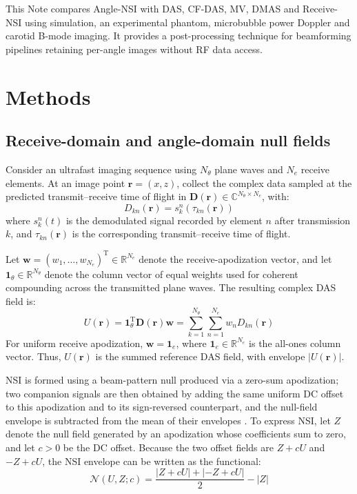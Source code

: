 \documentclass{iopjournal}
\newcommand{\ones}{\bm{1}}
\newcommand{\Dmat}{\bm{D}}
\newcommand{\rvec}{\bm{r}}
\providecommand{\revstart}{}
\providecommand{\revstop}{}
\begin{document}
\revstart This Note compares Angle-NSI with DAS, CF-DAS, MV, DMAS and Receive-NSI using simulation, an experimental phantom, microbubble power Doppler and carotid B-mode imaging. It provides a post-processing technique for beamforming pipelines retaining per-angle images without RF data access. \revstop

\section{Methods}

\subsection{Receive-domain and angle-domain null fields}

Consider an ultrafast imaging sequence using $N_\theta$ plane waves and $N_e$
receive elements. At an image point $\rvec=(x,z)$, collect the complex data
sampled at the predicted transmit--receive time of flight in
$\Dmat(\rvec)\in\mathbb{C}^{N_\theta\times N_e}$, with:
\begin{equation}
D_{kn}(\rvec)=s_k^n\!\left(\tau_{kn}(\rvec)\right)
\end{equation}
where $s_k^n(t)$ is the demodulated signal recorded by element $n$ after
transmission $k$, and $\tau_{kn}(\rvec)$ is the corresponding
transmit--receive time of flight.

Let $\bm{w}=(w_1,\ldots,w_{N_e})^{\mathrm T}\in\mathbb{R}^{N_e}$ denote the
receive-apodization vector, and let $\ones_\theta\in\mathbb{R}^{N_\theta}$
denote the column vector of equal weights used for coherent compounding across
the transmitted plane waves. The resulting complex DAS field is:
\begin{equation}
U(\rvec)=\ones_\theta^{\mathrm T}\Dmat(\rvec)\bm{w}
=\sum_{k=1}^{N_\theta}\sum_{n=1}^{N_e}w_nD_{kn}(\rvec)
\label{eq:uniform}
\end{equation}
\revstart For uniform receive apodization, $\boldsymbol{w}=\boldsymbol{1}_e$, where $\boldsymbol{1}_e\in\mathbb{R}^{N_e}$ is the all-ones column vector. Thus, $U(\boldsymbol{r})$ is the summed reference DAS field, with envelope $|U(\boldsymbol{r})|$. \revstop

NSI is formed using a beam-pattern null produced via a zero-sum apodization; two
companion signals are then obtained by adding the same uniform DC offset to this
apodization and to its sign-reversed counterpart, and the null-field envelope
is subtracted from the mean of their envelopes
\citep{agarwal2019improving}. To express NSI, let $Z$ denote \revstart the null field generated by an apodization whose coefficients sum to zero\revstop, and let $c>0$ be the DC offset. Because the two offset fields are $Z+cU$ and
$-Z+cU$, the NSI envelope can be written as the functional:
\begin{equation}
\mathcal{N}(U,Z;c)=\frac{|Z+cU|+|-Z+cU|}{2}-|Z|
\label{eq:functional}
\end{equation}
\end{document}
